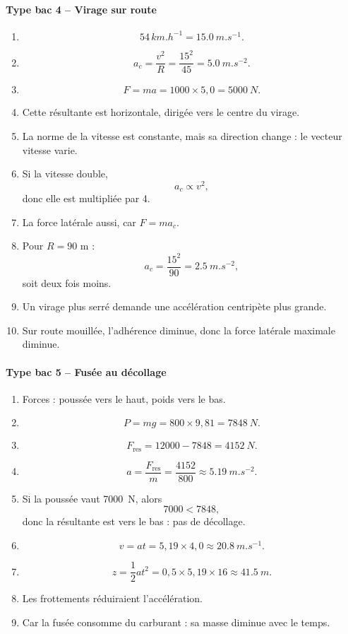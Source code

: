 \documentclass[11pt,a4paper]{article}
\theoremstyle{definition}
\begin{document}
\paragraph{Type bac 4 -- Virage sur route}
\begin{enumerate}[label=\arabic*.]
    \item
    \[
    54\,\si{km.h^{-1}}=\SI{15,0}{m.s^{-1}}.
    \]
    \item
    \[
    a_c=\frac{v^2}{R}=\frac{15^2}{45}=\SI{5,0}{m.s^{-2}}.
    \]
    \item
    \[
    F=ma=1000\times 5,0=\SI{5000}{N}.
    \]
    \item Cette résultante est horizontale, dirigée vers le centre du virage.
    \item La norme de la vitesse est constante, mais sa direction change : le vecteur vitesse varie.
    \item Si la vitesse double,
    \[
    a_c\propto v^2,
    \]
    donc elle est multipliée par 4.
    \item La force latérale aussi, car $F=ma_c$.
    \item Pour $R=90$ m :
    \[
    a_c=\frac{15^2}{90}=\SI{2,5}{m.s^{-2}},
    \]
    soit deux fois moins.
    \item Un virage plus serré demande une accélération centripète plus grande.
    \item Sur route mouillée, l’adhérence diminue, donc la force latérale maximale diminue.
\end{enumerate}

\paragraph{Type bac 5 -- Fusée au décollage}
\begin{enumerate}[label=\arabic*.]
    \item Forces : poussée vers le haut, poids vers le bas.
    \item
    \[
    P=mg=800\times 9,81=\SI{7848}{N}.
    \]
    \item
    \[
    F_{\text{res}}=12000-7848=\SI{4152}{N}.
    \]
    \item
    \[
    a=\frac{F_{\text{res}}}{m}=\frac{4152}{800}\approx \SI{5,19}{m.s^{-2}}.
    \]
    \item Si la poussée vaut \SI{7000}{N}, alors
    \[
    7000<7848,
    \]
    donc la résultante est vers le bas : pas de décollage.
    \item
    \[
    v=at=5,19\times 4,0\approx \SI{20,8}{m.s^{-1}}.
    \]
    \item
    \[
    z=\frac12 at^2=0,5\times5,19\times16\approx \SI{41,5}{m}.
    \]
    \item Les frottements réduiraient l’accélération.
    \item Car la fusée consomme du carburant : sa masse diminue avec le temps.
\end{enumerate}
\end{document}
